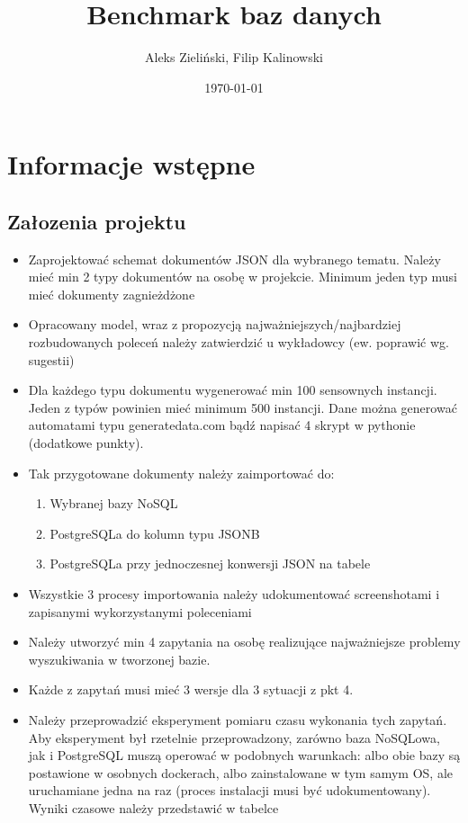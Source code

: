 \documentclass[11pt]{article}
\title{\textbf{Benchmark baz danych}}
\author{Aleks Zieliński, Filip Kalinowski}
\date{\today}
\begin{document}
\maketitle

\begingroup
\tableofcontents
\endgroup

\newpage
\section{Informacje wstępne}
	\subsection{Załozenia projektu}
		\begin{itemize}
			\item Zaprojektować schemat dokumentów JSON dla wybranego tematu. Należy mieć min 2 typy dokumentów na osobę w projekcie. Minimum jeden typ musi mieć dokumenty zagnieżdżone
			\item  Opracowany model, wraz z propozycją najważniejszych/najbardziej rozbudowanych poleceń należy zatwierdzić u wykładowcy (ew. poprawić wg. sugestii)
			\item Dla każdego typu dokumentu wygenerować min 100 sensownych instancji. Jeden z typów powinien mieć minimum 500 instancji. Dane można generować automatami typu generatedata.com bądź napisać 4 skrypt w pythonie (dodatkowe punkty).
			\item  Tak przygotowane dokumenty należy zaimportować do:
			\begin{enumerate}
				\item Wybranej bazy NoSQL
				\item PostgreSQLa do kolumn typu JSONB
				\item PostgreSQLa przy jednoczesnej konwersji JSON na tabele
			\end{enumerate}
			\item Wszystkie 3 procesy importowania należy udokumentować screenshotami i zapisanymi wykorzystanymi poleceniami
			\item  Należy utworzyć min 4 zapytania na osobę realizujące najważniejsze problemy wyszukiwania w tworzonej bazie. 
			\item Każde z zapytań musi mieć 3 wersje dla 3 sytuacji z pkt 4. 
			\item Należy przeprowadzić eksperyment pomiaru czasu wykonania tych zapytań. Aby eksperyment był rzetelnie przeprowadzony, zarówno baza NoSQLowa, jak i PostgreSQL muszą operować w podobnych warunkach: albo obie bazy są postawione w osobnych dockerach, albo zainstalowane w tym samym OS, ale uruchamiane jedna na raz (proces instalacji musi być udokumentowany). Wyniki czasowe należy przedstawić w tabelce
		\end{itemize}
\end{document}
